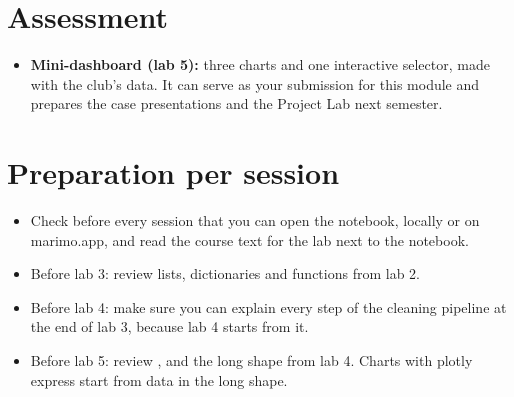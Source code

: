 \documentclass[11pt,a4paper]{article}
\begin{document}
\section{Assessment}

\begin{itemize}
  \item \textbf{Mini-dashboard (lab 5):} three charts and one interactive
        selector, made with the club's data. It can serve as your
        submission for this module and prepares the case presentations
        and the Project Lab next semester.
\end{itemize}

\section{Preparation per session}

\begin{itemize}
  \item Check before every session that you can open the notebook,
        locally or on marimo.app, and read the course text for the lab
        next to the notebook.
  \item Before lab 3: review lists, dictionaries and functions from
        lab 2.
  \item Before lab 4: make sure you can explain every step of the
        cleaning pipeline at the end of lab 3, because lab 4 starts from
        it.
  \item Before lab 5: review ,  and the long
        shape from lab 4. Charts with plotly express start from data in
        the long shape.
\end{itemize}
\end{document}
